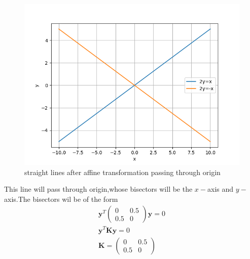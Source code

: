 \documentclass[journal,12pt,twocolumn]{IEEEtran}
\newcommand{\myvec}[1]{\ensuremath{\begin{pmatrix}#1\end{pmatrix}}}
\numberwithin{equation}{subsection}
\let\vec\mathbf
\begin{document}
\begin{figure}[h]
    \centering
    \includegraphics[width=\columnwidth]{Fig1_a5.png}
    \caption{straight lines after affine transformation passing through origin}
    \label{fig:1}
\end{figure}
This line will pass through origin,whose bisectors will be the $x-$axis and $y-$axis.The bisectors wil be of the form
\begin{align}
    \vec{y}^T\myvec{0&0.5\\0.5&0}\vec{y}=0\\
    \vec{y}^T\vec{K}\vec{y}=0\\
    \vec{K}=\myvec{0&0.5\\0.5&0}
\end{align}
\end{document}
